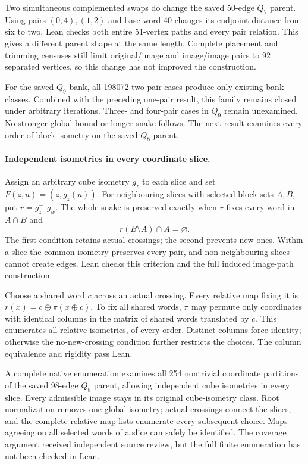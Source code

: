 \documentclass[11pt,a4paper]{article}
\begin{document}
Two simultaneous complemented swaps do change the saved 50-edge
$Q_7$ parent. Using pairs $(0,4),(1,2)$ and base word 40 changes
its endpoint distance from six to two. Lean checks both entire
51-vertex paths and every pair relation. This gives a different
parent shape at the same length. Complete placement and trimming
censuses still limit original/image and image/image pairs to 92
separated vertices, so this change has not improved the construction.

For the saved $Q_9$ bank, all 198072 two-pair cases produce only
existing bank classes. Combined with the preceding one-pair result,
this family remains closed under arbitrary iterations. Three- and
four-pair cases in $Q_9$ remain unexamined. No stronger global bound
or longer snake follows. The next result examines every order of
block isometry on the saved $Q_8$ parent.

\paragraph{Independent isometries in every coordinate slice.}
Assign an arbitrary cube isometry $g_z$ to each slice and set
$F(z,u)=(z,g_z(u))$. For neighbouring slices with selected block
sets $A,B$, put $r=g_z^{-1}g_w$. The whole snake is preserved exactly
when $r$ fixes every word in $A\cap B$ and
\[
r(B\setminus A)\cap A=\varnothing.
\]
The first condition retains actual crossings; the second prevents
new ones. Within a slice the common isometry preserves every pair,
and non-neighbouring slices cannot create edges. Lean checks this
criterion and the full induced image-path construction.

Choose a shared word $c$ across an actual crossing. Every relative
map fixing it is $r(x)=c\oplus\pi(x\oplus c)$. To fix all shared
words, $\pi$ may permute only coordinates with identical columns
in the matrix of shared words translated by $c$. This enumerates
all relative isometries, of every order. Distinct columns force
identity; otherwise the no-new-crossing condition further restricts
the choices. The column equivalence and rigidity pass Lean.

A complete native enumeration examines all 254 nontrivial coordinate
partitions of the saved 98-edge $Q_8$ parent, allowing independent
cube isometries in every slice. Every admissible image stays in its
original cube-isometry class. Root normalization removes one global
isometry; actual crossings connect the slices, and the complete
relative-map lists enumerate every subsequent choice. Maps agreeing
on all selected words of a slice can safely be identified. The
coverage argument received independent source review, but the full
finite enumeration has not been checked in Lean.
\end{document}
